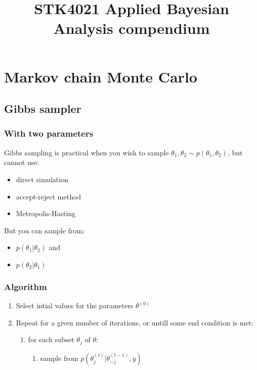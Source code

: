 \documentclass{article}
\title{STK4021 Applied Bayesian Analysis compendium}
\author{}
\begin{document}
    \maketitle

    \tableofcontents

    \section{Markov chain Monte Carlo}

        \subsection{Gibbs sampler}

            \subsubsection*{With two parameters}
                Gibbs sampling is practical when you wish to sample $\theta_1, \theta_2 \sim p(\theta_1, \theta_2)$, but cannot use:
                \begin{itemize}
                    \item direct simulation
                    \item accept-reject method
                    \item Metropolis-Hasting
                \end{itemize}
                But you can sample from:
                \begin{itemize}
                    \item $p(\theta_1 | \theta_2)$ and
                    \item $p(\theta_2 | \theta_1)$
                \end{itemize}

            \subsubsection*{Algorithm}
                \begin{enumerate}
                    \item Select intial values for the parameters $\theta^{(0)}$
                    \item Repeat for a given number of iterations, or untill some end condition is met:
                    \begin{enumerate}    
                        \item for each subset $\theta_j$ of $\theta$:
                        \begin{enumerate}
                            \item sample from $p\left(\theta_j^{(t)} | \theta_{-j}^{(t-1)}, y\right)$
                        \end{enumerate}
                    \end{enumerate}
                \end{enumerate}
\end{document}
